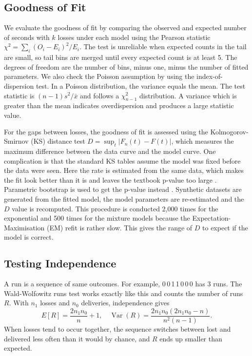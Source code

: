 \documentclass[conference]{IEEEtran}
\begin{document}
\subsection{Goodness of Fit}
We evaluate the goodness of fit by comparing the observed and expected number of seconds with $k$ losses under each model using the Pearson statistic $\chi^2=\sum_i (O_i-E_i)^2/E_i$. The test is unreliable when expected counts in the tail are small, so tail bins are merged until every expected count is at least 5. The degrees of freedom are the number of bins, minus one, minus the number of fitted parameters. We also check the Poisson assumption by using the index-of-dispersion test. In a Poisson distribution, the variance equals the mean. The test statistic is $(n-1)s^2/\bar x$ and follows a $\chi^2_{n-1}$ distribution. A variance which is greater than the mean indicates overdispersion and produces a large statistic value.

For the gaps between losses, the goodness of fit is assessed using the Kolmogorov-Smirnov (KS) distance test $D=\sup_t|F_n(t)-F(t)|$, which measures the maximum difference between the data curve and the model curve. One complication is that the standard KS tables assume the model was fixed before the data were seen. Here the rate is estimated from the same data, which makes the fit look better than it is and leaves the textbook p-value too large \cite{lilliefors1969}. Parametric bootstrap is used to get the p-value instead \cite{efron1993}. Synthetic datasets are generated from the fitted model, the model parameters are re-estimated and the $D$ value is recomputed. This procedure is conducted 2,000 times for the exponential and 500 times for the mixture models because the Expectation-Maximisation (EM) refit is rather slow. This gives the range of $D$ to expect if the model is correct.

\subsection{Testing Independence}
A run is a sequence of same outcomes. For example, 0\,0\,1\,1\,0\,0\,0 has 3 runs. The Wald-Wolfowitz runs test \cite{wald1940} works exactly like this and counts the number of runs $R$. With $n_1$ losses and $n_0$ deliveries, independence gives
\begin{equation}
E[R]=\frac{2n_1n_0}{n}+1,\quad \operatorname{Var}(R)=\frac{2n_1n_0(2n_1n_0-n)}{n^2(n-1)} .
\end{equation}
When losses tend to occur together, the sequence switches between lost and delivered less often than it would by chance, and $R$ ends up smaller than expected.
\end{document}
